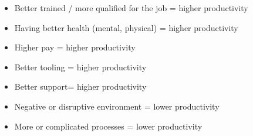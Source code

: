 \documentclass[12pt]{article}
\begin{document}
\begin{itemize}
  \item Better trained / more qualified for the job = higher productivity
  \item Having better health (mental, physical) = higher productivity
  \item Higher pay = higher productivity
  \item Better tooling = higher productivity
  \item Better support= higher productivity
  \item Negative or disruptive environment = lower productivity
  \item More or complicated processes = lower productivity
\end{itemize}





\end{document}

